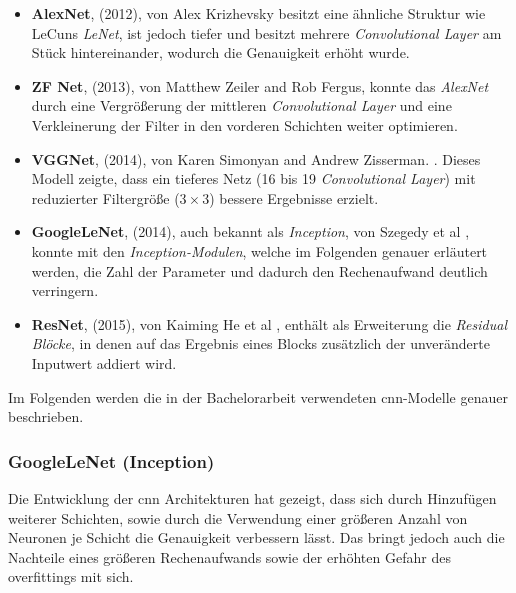 \begin{itemize}
    \item \textbf{AlexNet}, (2012), von Alex Krizhevsky 
        \cite{krizhevskyImageNetClassificationDeep2017b} besitzt eine 
        ähnliche Struktur wie LeCuns \textit{LeNet},
        ist jedoch tiefer und besitzt mehrere \textit{Convolutional
         Layer} am Stück hintereinander,
        wodurch die Genauigkeit erhöht wurde.

    \item \textbf{ZF Net}, (2013), von Matthew Zeiler and Rob Fergus,
        \cite{zeilerVisualizingUnderstandingConvolutional2013}
        konnte das \textit{AlexNet} durch eine Vergrößerung der 
        mittleren \textit{Convolutional Layer}
        und eine Verkleinerung der Filter in den vorderen
        Schichten weiter optimieren.

    \item \textbf{VGGNet}, (2014), von Karen Simonyan and Andrew Zisserman.
        \cite{simonyanVeryDeepConvolutional2015}.
        Dieses Modell zeigte, dass ein tieferes Netz
         (16 bis 19 \textit{Convolutional Layer})
        mit reduzierter Filtergröße ($3\times3$) bessere
        Ergebnisse erzielt.    

    \item \textbf{GoogleLeNet}, (2014), auch bekannt als \textit{Inception},
        von Szegedy et al \cite{szegedyGoingDeeperConvolutions2014},
        konnte mit den \textit{Inception-Modulen},
        welche im Folgenden genauer erläutert werden, die Zahl der 
        Parameter und dadurch den Rechenaufwand deutlich verringern.

    \item \textbf{ResNet}, (2015), von Kaiming He et al 
        \cite{heDeepResidualLearning2015}, enthält 
        als Erweiterung die \textit{Residual Blöcke}, in denen auf
        das Ergebnis eines Blocks zusätzlich der unveränderte
        Inputwert addiert wird.
\end{itemize}


Im Folgenden werden die in der Bachelorarbeit verwendeten 
\Gls{cnn}-Modelle genauer beschrieben.

\subsubsection{GoogleLeNet (Inception)}

Die Entwicklung der \Gls{cnn} Architekturen hat gezeigt,
dass sich durch Hinzufügen weiterer Schichten, sowie
durch die Verwendung einer größeren Anzahl von Neuronen je Schicht 
die Genauigkeit verbessern lässt.
Das bringt jedoch auch die Nachteile eines 
größeren Rechenaufwands sowie der erhöhten 
Gefahr des \Glspl{overfitting} mit sich.

